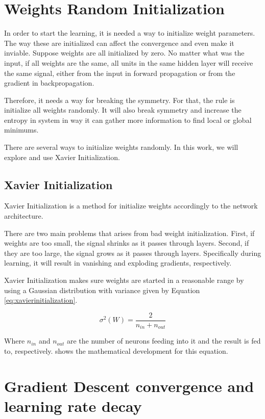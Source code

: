 \section{Weights Random Initialization}
In order to start the learning, it is needed a way to initialize weight parameters. The way these are initialized can affect the convergence and even make it inviable.
Suppose weights are all initialized by zero. No matter what was the input, if all weights are the same, all units in the same hidden layer will receive the same signal, either from the input in forward propagation or from the gradient in backpropagation. 

Therefore, it needs a way for breaking the symmetry. For that, the rule is initialize all weights randomly. It will also break symmetry and increase the entropy in system in way it can gather more information to find local or global minimums.

There are several ways to initialize weights randomly. In this work, we will explore and use Xavier Initialization.


\subsection{Xavier Initialization}

Xavier Initialization \cite{Glorot10} is a method for initialize weights accordingly to the network architecture. 

There are two main problems that arises from bad weight initialization. First, if weights are too small, the signal shrinks as it passes through layers. Second, if they are too large, the signal grows as it passes through layers. Specifically during learning, it will result in vanishing and exploding gradients, respectively.

Xavier Initialization makes sure weights are started in a reasonable range by using a Gaussian distribution with variance given by Equation \ref{eq:xavierinitialization}.

\begin{equation}\label{eq:xavierinitialization}
	\sigma^{2}(W) = \frac{2}{n_{in} + n_{out}}
\end{equation}

Where $n_{in}$ and $n_{out}$ are the number of neurons feeding into it and the result is fed to, respectively. \cite{Glorot10} shows the mathematical development for this equation.

\section{Gradient Descent convergence and learning rate decay}


